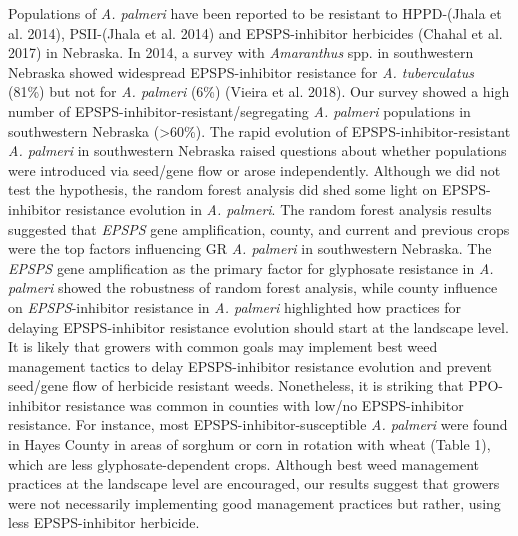 \documentclass[
  12pt,
  a4paper]{article}
\begin{document}
Populations of \emph{A. palmeri} have been reported to be resistant to
HPPD-(Jhala et al. 2014), PSII-(Jhala et al. 2014) and EPSPS-inhibitor
herbicides (Chahal et al. 2017) in Nebraska. In 2014, a survey with
\emph{Amaranthus} spp. in southwestern Nebraska showed widespread
EPSPS-inhibitor resistance for \emph{A. tuberculatus} (81\%) but not for
\emph{A. palmeri} (6\%) (Vieira et al. 2018). Our survey showed a high
number of EPSPS-inhibitor-resistant/segregating \emph{A. palmeri}
populations in southwestern Nebraska (\textgreater60\%). The rapid
evolution of EPSPS-inhibitor-resistant \emph{A. palmeri} in southwestern
Nebraska raised questions about whether populations were introduced via
seed/gene flow or arose independently. Although we did not test the
hypothesis, the random forest analysis did shed some light on
EPSPS-inhibitor resistance evolution in \emph{A. palmeri}. The random
forest analysis results suggested that \emph{EPSPS} gene amplification,
county, and current and previous crops were the top factors influencing
GR \emph{A. palmeri} in southwestern Nebraska. The \emph{EPSPS} gene
amplification as the primary factor for glyphosate resistance in
\emph{A. palmeri} showed the robustness of random forest analysis, while
county influence on \emph{EPSPS}-inhibitor resistance in \emph{A.
palmeri} highlighted how practices for delaying EPSPS-inhibitor
resistance evolution should start at the landscape level. It is likely
that growers with common goals may implement best weed management
tactics to delay EPSPS-inhibitor resistance evolution and prevent
seed/gene flow of herbicide resistant weeds. Nonetheless, it is striking
that PPO-inhibitor resistance was common in counties with low/no
EPSPS-inhibitor resistance. For instance, most
EPSPS-inhibitor-susceptible \emph{A. palmeri} were found in Hayes County
in areas of sorghum or corn in rotation with wheat (Table 1), which are
less glyphosate-dependent crops. Although best weed management practices
at the landscape level are encouraged, our results suggest that growers
were not necessarily implementing good management practices but rather,
using less EPSPS-inhibitor herbicide.
\end{document}
